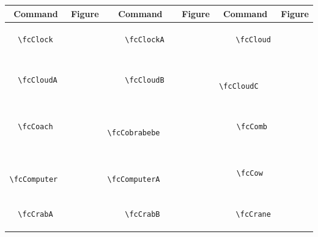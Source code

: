 \documentclass[x11names]{article}
\begin{document}
\begin{table}[H]\centering\begin{tabular}{|c|c|c|c|c|c|}\hline{\bf Command} & {\bf Figure} & {\bf Command} & {\bf Figure} & {\bf Command} & {\bf Figure}\\	\hline	&\multirow{5}{*}{	\fcClock	[scale=0.16]} & &\multirow{5}{*}{	\fcClockA	[scale=0.16]} & &\multirow{5}{*}{	\fcCloud	[scale=0.64]}\\	& & & & & \\	& & & & & \\	\verb|	\fcClock	| & & \verb|	\fcClockA	| & & \verb|	\fcCloud	| & \\	& & & & & \\	& & & & & \\	& & & & & \\	\hline									
		&\multirow{5}{*}{	\fcCloudA	[scale=0.16]} & &\multirow{5}{*}{	\fcCloudB	[scale=0.16]} & &\multirow{5}{*}{	\fcCloudC	[scale=0.16]}\\	& & & & & \\	& & & & & \\	\verb|	\fcCloudA	| & & \verb|	\fcCloudB	| & & \verb|	\fcCloudC	| & \\	& & & & & \\	& & & & & \\	& & & & & \\	\hline									
		&\multirow{5}{*}{	\fcCoach	[scale=0.16]} & &\multirow{5}{*}{	\fcCobrabebe	[scale=0.16]} & &\multirow{5}{*}{	\fcComb	[scale=0.16]}\\	& & & & & \\	& & & & & \\	\verb|	\fcCoach	| & & \verb|	\fcCobrabebe	| & & \verb|	\fcComb	| & \\	& & & & & \\	& & & & & \\	& & & & & \\	\hline									
		&\multirow{5}{*}{	\fcComputer	[scale=0.16]} & &\multirow{5}{*}{	\fcComputerA	[scale=0.16]} & &\multirow{5}{*}{	\fcCow	[scale=0.64]}\\	& & & & & \\	& & & & & \\	\verb|	\fcComputer	| & & \verb|	\fcComputerA	| & & \verb|	\fcCow	| & \\	& & & & & \\	& & & & & \\	& & & & & \\	\hline									
		&\multirow{5}{*}{	\fcCrabA	[scale=0.16]} & &\multirow{5}{*}{	\fcCrabB	[scale=0.16]} & &\multirow{5}{*}{	\fcCrane	[scale=0.16]}\\	& & & & & \\	& & & & & \\	\verb|	\fcCrabA	| & & \verb|	\fcCrabB	| & & \verb|	\fcCrane	| & \\	& & & & & \\	& & & & & \\	& & & & & \\	\hline									

\end{tabular}
\end{table}
\end{document}
